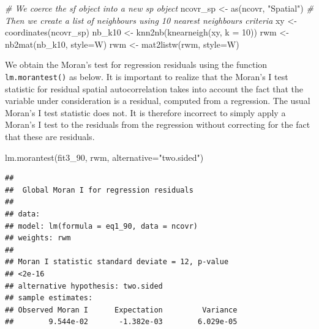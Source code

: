 \documentclass[
  krantz2]{krantz}
\makeatletter
\newenvironment{Shaded}{\begin{snugshade}}{\end{snugshade}}
\newcommand{\AttributeTok}[1]{\textcolor[rgb]{0.61,0.61,0.61}{#1}}
\newcommand{\CommentTok}[1]{\textcolor[rgb]{0.37,0.37,0.37}{\textit{#1}}}
\newcommand{\DecValTok}[1]{\textcolor[rgb]{0.06,0.06,0.06}{#1}}
\newcommand{\FunctionTok}[1]{\textcolor[rgb]{0,0,0}{#1}}
\newcommand{\NormalTok}[1]{#1}
\newcommand{\OtherTok}[1]{\textcolor[rgb]{0.37,0.37,0.37}{#1}}
\newcommand{\StringTok}[1]{\textcolor[rgb]{0.5,0.5,0.5}{#1}}
\newenvironment{kframe}{%
\medskip{}
\setlength{\fboxsep}{.8em}
 \def\at@end@of@kframe{}%
 \ifinner\ifhmode%
  \def\at@end@of@kframe{\end{minipage}}%
  \begin{minipage}{\columnwidth}%
 \fi\fi%
 \def\FrameCommand##1{\hskip\@totalleftmargin \hskip-\fboxsep
 \colorbox{shadecolor}{##1}\hskip-\fboxsep
     \hskip-\linewidth \hskip-\@totalleftmargin \hskip\columnwidth}%
 \MakeFramed {\advance\hsize-\width
   \@totalleftmargin\z@ \linewidth\hsize
   \@setminipage}}%
 {\par\unskip\endMakeFramed%
 \at@end@of@kframe}
\renewenvironment{Shaded}{\begin{kframe}}{\end{kframe}}
\makeatother
\begin{document}
\begin{Shaded}
\begin{Highlighting}[]
\CommentTok{\# We coerce the sf object into a new sp object}
\NormalTok{ncovr\_sp }\OtherTok{\textless{}{-}} \FunctionTok{as}\NormalTok{(ncovr, }\StringTok{"Spatial"}\NormalTok{)}
\CommentTok{\# Then we create a list of neighbours using 10 nearest neighbours criteria}
\NormalTok{xy }\OtherTok{\textless{}{-}} \FunctionTok{coordinates}\NormalTok{(ncovr\_sp)}
\NormalTok{nb\_k10 }\OtherTok{\textless{}{-}} \FunctionTok{knn2nb}\NormalTok{(}\FunctionTok{knearneigh}\NormalTok{(xy, }\AttributeTok{k =} \DecValTok{10}\NormalTok{))}
\NormalTok{rwm }\OtherTok{\textless{}{-}} \FunctionTok{nb2mat}\NormalTok{(nb\_k10, }\AttributeTok{style=}\StringTok{\textquotesingle{}W\textquotesingle{}}\NormalTok{)}
\NormalTok{rwm }\OtherTok{\textless{}{-}} \FunctionTok{mat2listw}\NormalTok{(rwm, }\AttributeTok{style=}\StringTok{\textquotesingle{}W\textquotesingle{}}\NormalTok{)}
\end{Highlighting}
\end{Shaded}

We obtain the Moran's test for regression residuals using the function \texttt{lm.morantest()} as below. It is important to realize that the Moran's I test statistic for residual spatial autocorrelation takes into account the fact that the variable under consideration is a residual, computed from a regression. The usual Moran's I test statistic does not. It is therefore incorrect to simply apply a Moran's I test to the residuals from the regression without correcting for the fact that these are residuals.

\begin{Shaded}
\begin{Highlighting}[]
\FunctionTok{lm.morantest}\NormalTok{(fit3\_90, rwm, }\AttributeTok{alternative=}\StringTok{"two.sided"}\NormalTok{)}
\end{Highlighting}
\end{Shaded}

\begin{verbatim}
## 
##  Global Moran I for regression residuals
## 
## data:  
## model: lm(formula = eq1_90, data = ncovr)
## weights: rwm
## 
## Moran I statistic standard deviate = 12, p-value
## <2e-16
## alternative hypothesis: two.sided
## sample estimates:
## Observed Moran I      Expectation         Variance 
##        9.544e-02       -1.382e-03        6.029e-05
\end{verbatim}
\end{document}
